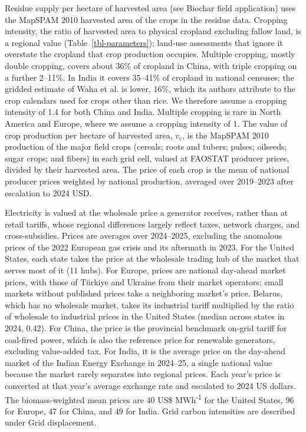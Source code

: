 \documentclass[
  letterpaper,
  twoside,
  twocolumn,
  9pt]{article}
\begin{document}
Residue supply per hectare of harvested area (see Biochar field
application) uses the MapSPAM 2010 harvested area of the crops in the
residue data.\citep{yu2020spam} Cropping intensity, the ratio of
harvested area to physical cropland excluding fallow land, is a regional
value (Table~\ref{tbl-parameters}); land-use assessments that ignore it
overstate the cropland that crop production occupies.\citep{waha2025}
Multiple cropping, mostly double cropping, covers about 36\% of cropland
in China, with triple cropping on a further 2--11\%.\citep{waha2020} In
India it covers 35--41\% of cropland in national censuses; the gridded
estimate of Waha et al.\citep{waha2020} is lower, 16\%, which its
authors attribute to the crop calendars used for crops other than rice.
We therefore assume a cropping intensity of 1.4 for both China and
India. Multiple cropping is rare in North America and
Europe,\citep{waha2020} where we assume a cropping intensity of 1. The
value of crop production per hectare of harvested area,
\(v_{\mathrm{c}}\), is the MapSPAM 2010 production of the major field
crops (cereals; roots and tubers; pulses; oilseeds; sugar crops; and
fibers) in each grid cell, valued at FAOSTAT producer
prices,\citep{faostat2025} divided by their harvested area. The price of
each crop is the mean of national producer prices weighted by national
production, averaged over 2019--2023 after escalation to 2024 USD.

Electricity is valued at the wholesale price a generator receives,
rather than at retail tariffs, whose regional differences largely
reflect taxes, network charges, and cross-subsidies. Prices are averages
over 2024--2025, excluding the anomalous prices of the 2022 European gas
crisis and its aftermath in 2023. For the United States, each state
takes the price at the wholesale trading hub of the market that serves
most of it (11 hubs).\citep{eia2026steo} For Europe, prices are national
day-ahead market prices,\citep{ember2026price} with those of Türkiye
\citep{epias2026} and Ukraine \citep{marketoperator2026} from their
market operators; small markets without published prices take a
neighboring market's price. Belarus, which has no wholesale market,
takes its industrial tariff \citep{climatescope2021} multiplied by the
ratio of wholesale to industrial prices in the United States (median
across states in 2024, 0.42).\citep{eia2026steo, eia2025epa} For China,
the price is the provincial benchmark on-grid tariff for coal-fired
power,\citep{ndrc2019} which is also the reference price for renewable
generators, excluding value-added tax. For India, it is the average
price on the day-ahead market of the Indian Energy Exchange in
2024--25,\citep{cerc2025stm} a single national value because the market
rarely separates into regional prices. Each year's price is converted at
that year's average exchange rate \citep{worldbank2026fx} and escalated
to 2024 US dollars. The biomass-weighted mean prices are 40 US\$
MWh\textsuperscript{-1} for the United States, 96 for Europe, 47 for
China, and 49 for India. Grid carbon intensities are described under
Grid displacement.
\end{document}
